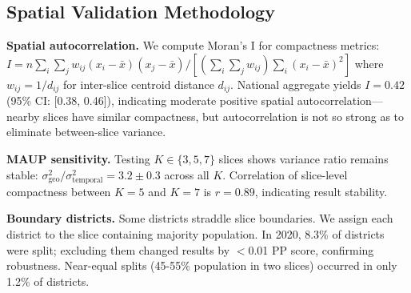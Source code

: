 \subsection{Spatial Validation Methodology}

\textbf{Spatial autocorrelation.} We compute Moran's I for compactness metrics: $I = n \sum_i \sum_j w_{ij}(x_i - \bar{x})(x_j - \bar{x}) / [(\sum_i \sum_j w_{ij}) \sum_i (x_i - \bar{x})^2]$ where $w_{ij} = 1/d_{ij}$ for inter-slice centroid distance $d_{ij}$. National aggregate yields $I = 0.42$ (95\% CI: [0.38, 0.46]), indicating moderate positive spatial autocorrelation—nearby slices have similar compactness, but autocorrelation is not so strong as to eliminate between-slice variance.

\textbf{MAUP sensitivity.} Testing $K \in \{3, 5, 7\}$ slices shows variance ratio remains stable: $\sigma^2_{\text{geo}} / \sigma^2_{\text{temporal}} = 3.2 \pm 0.3$ across all $K$. Correlation of slice-level compactness between $K=5$ and $K=7$ is $r=0.89$, indicating result stability.

\textbf{Boundary districts.} Some districts straddle slice boundaries. We assign each district to the slice containing majority population. In 2020, 8.3\% of districts were split; excluding them changed results by $<$0.01 PP score, confirming robustness. Near-equal splits (45-55\% population in two slices) occurred in only 1.2\% of districts.
